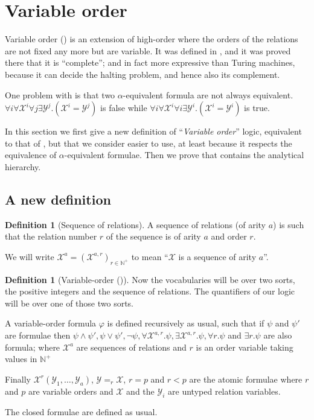 \documentclass[a4paper,12pt]{article}
\newcommand{\emphdex}[1]{\index{#1}\emph{#1}}
\theoremstyle{definition}
\newtheorem{definition}[theorem]{Definition}
\renewcommand{\phi}{\varphi}
\newcommand{\mc}{\mathcal}
\begin{document}
\section{Variable order}\label{vo}
Variable order (\VO{}) is an extension of high-order where the orders
of the relations are not fixed any more but are variable. It was defined
in \cite{lauri}, and it was proved there that it is ``complete''; and in
fact more expressive than Turing machines, because it can decide the
halting problem, and hence also its complement.

One problem with \VO{} is that two $\alpha$-equivalent formula are not
always equivalent. \\$\forall i\forall \mc X^{i}\forall j\exists \mc
Y^{j}.(\mc X^{i}=\mc Y^{j})$ is false while $\forall i\forall \mc
X^{i}\forall i\exists \mc Y^{i}.(\mc X^{i}=\mc Y^{i})$ is true.

In this section we first give a new definition of
``\emphdex{Variable order}'' logic, equivalent to that of
\cite{lauri}, but that we consider easier to use, at least because it
respects the equivalence of $\alpha$-equivalent formulae.  Then we
prove that \VO{} contains the analytical hierarchy.

\subsection{A new definition}


\begin{definition}[Sequence of relations]
  A sequence of relations (of arity $a$) is such that the relation
  number $r$ of the sequence is of arity $a$ and order $r$.

  We will write $\mathcal X^{a}=(\mc X^{a,r})_{r \in \mathbb N^+}$ to
  mean ``$\mc X$ is a sequence of arity $a$''.
\end{definition}
\begin{definition}[Variable-order (\VO{})]Now the vocabularies will be
  over two sorts, the positive integers and the sequence of relations.
  The quantifiers of our logic will be over one of those two
    sorts.

  A variable-order formula $\phi$ is defined recursively as usual,
  such that if $\psi$ and $\psi'$ are formulae then $\psi\land\psi',
  \psi\lor \psi', \neg\psi, \forall \mathcal X^{a,r}. \psi, \exists
  \mathcal X^{a,r}. \psi, \forall r. \psi$ and $\exists r. \psi$ are also
  formula; where $\mc X^a$ are sequences of relations and $r$ is an
  order variable taking values in $\mathbb N^+$

  Finally $\mathcal X^r(\mathcal Y_1,\dots,\mathcal Y_a)$, $\mathcal
  Y=_r\mathcal X$, $r=p$ and $r<p$ are the atomic formulae where $r$
  and $p$ are variable orders and $\mc X$ and the $\mc Y_i$ are
  untyped relation variables.

  The closed formulae are defined as usual.
\end{definition}
\end{document}
